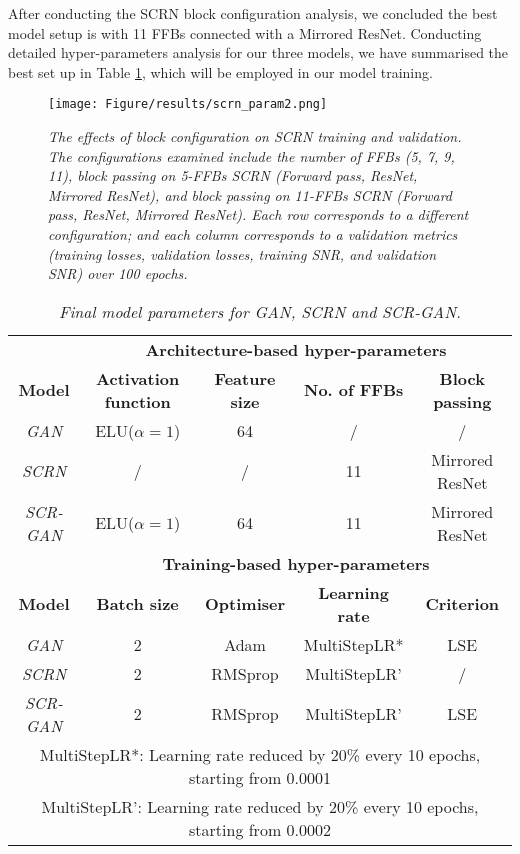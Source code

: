 \noindent After conducting the SCRN block configuration analysis, we concluded the best model setup is with 11 FFBs connected with a Mirrored ResNet. Conducting detailed hyper-parameters analysis for our three models, we have summarised the best set up in Table \ref{tab:model_param}, which will be employed in our model training. 


\begin{figure}[h]
	\centering
	\texttt{[image: Figure/results/scrn\_param2.png]} %
	\caption{\textit{The effects of block configuration on SCRN training and validation. The configurations examined include the number of FFBs (5, 7, 9, 11), block passing on 5-FFBs SCRN (Forward pass, ResNet, Mirrored ResNet), and block passing on 11-FFBs SCRN  (Forward pass, ResNet, Mirrored ResNet). Each row corresponds to a different configuration; and each column corresponds to a validation metrics (training losses, validation losses, training SNR, and validation SNR) over 100 epochs.}}
	\label{fig:scrn_param2}
\end{figure}



\begin{table}[ht]
	\centering
	\begin{tabular}{ccccc}
		\hline
		& \multicolumn{4}{c}{\textbf{Architecture-based hyper-parameters}}\\
		\textbf{Model} & \textbf{Activation function} & \textbf{Feature size} & \textbf{No. of FFBs} & \textbf{Block passing}\\ 
		\hline
		\textit{GAN} & ELU($\alpha=1$) & 64 & / & /\\
		\textit{SCRN}& / & / & 11 & Mirrored ResNet\\
		\textit{SCR-GAN}& ELU($\alpha=1$) & 64 & 11 & Mirrored ResNet\\
		\hline\hline
		& \multicolumn{4}{c}{\textbf{Training-based hyper-parameters}}\\
		\textbf{Model} & \textbf{Batch size} & \textbf{Optimiser} & \textbf{Learning rate} & \textbf{Criterion}\\
		\hline
		\textit{GAN} & 2 & Adam & MultiStepLR* & LSE\\
		\textit{SCRN}& 2 & RMSprop & MultiStepLR' & / \\
		\textit{SCR-GAN}& 2 & RMSprop & MultiStepLR' & LSE\\
		\hline
	    \multicolumn{5}{c}{MultiStepLR*: Learning rate reduced by 20\% every 10 epochs, starting from 0.0001      }\\
		\multicolumn{5}{c}{MultiStepLR': Learning rate reduced by 20\% every 10 epochs, starting from 0.0002      }\\
	\end{tabular}
	\caption{\textit{Final model parameters for GAN, SCRN and SCR-GAN.}}
	\label{tab:model_param}
\end{table}

